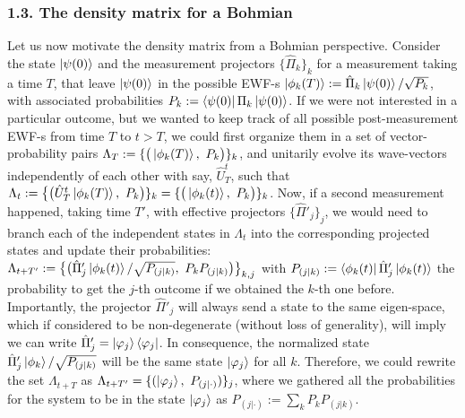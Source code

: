 \documentclass[11pt, a4paper]{article} %
\begin{document}
\subsubsection*{1.3. The density matrix for a Bohmian}\vspace{-0.15cm}
Let us now motivate the density matrix from a Bohmian perspective. Consider the state $\ket{\psi(0)}$ and the measurement projectors $\{\hat{\Pi}_k\}_k$ for a measurement taking a time $T$, that leave $\ket{\psi(0)}$ in the possible EWF-s $\ket{\phi_k(T)}:=\hat{\Pi}_k\ket{\psi(0)}/\sqrt{P_k}$, with associated probabilities $P_k:=\bra{\psi(0)}\Pi_k\ket{\psi(0)}$. If we were not interested in a particular outcome, but we wanted to keep track of all possible post-measurement EWF-s from time $T$ to $t>T$, we could first organize them in a set of vector-probability pairs $\Lambda_{T}:=\{\big(\ket{\phi_k(T)},\ P_k\big)\}_k$, and unitarily evolve its wave-vectors independently of each other with say, $\hat{U}_{T}^{t}$, such that $\Lambda_{t}:=\big\{\big(\hat{U}^t_T\ket{\phi_k(T)},\ P_k\big)\}_k=\{\big(\ket{\phi_k(t)},\ P_k\big)\}_k$. Now, if a second measurement happened, taking time $T'$, with effective projectors $\{\hat{\Pi}'_j\}_j$, we would need to branch each of the independent states in $\Lambda_t$ into the corresponding projected states and update their probabilities: $\Lambda_{t+T'}:=\big\{ \big(\hat{\Pi}_j'\ket{\phi_k(t)}/\sqrt{P_{(j|k)}},\ P_kP_{(j|k)}\big)\big\}_{k,j}$ with $P_{(j|k)}:=\bra{\phi_k(t)}\hat{\Pi}'_j\ket{\phi_k(t)}$ the probability to get the $j$-th outcome if we obtained the $k$-th one before. Importantly, the projector $\hat{\Pi}'_j$ will always send a state to the same eigen-space, which if considered to be non-degenerate (without loss of generality), will imply we can write $\hat{\Pi}'_j=\ket{\varphi_j}\bra{\varphi_j}$. In consequence, the normalized state $\hat{\Pi}'_j \ket{\phi_k}/\sqrt{P_{(j|k)}}$ will be the same state $\ket{\varphi_j}$ for all $k$. Therefore, we could rewrite the set $\Lambda_{t+T}$ as $\Lambda_{t+T'}=\{(\ket{\varphi_j},\ P_{(j|\cdot)})\}_j$, where we gathered all the probabilities for the system to be in the state $\ket{\varphi_j}$ as $P_{(j|\cdot)}:=\sum_k P_kP_{(j|k)}$.
\end{document}
